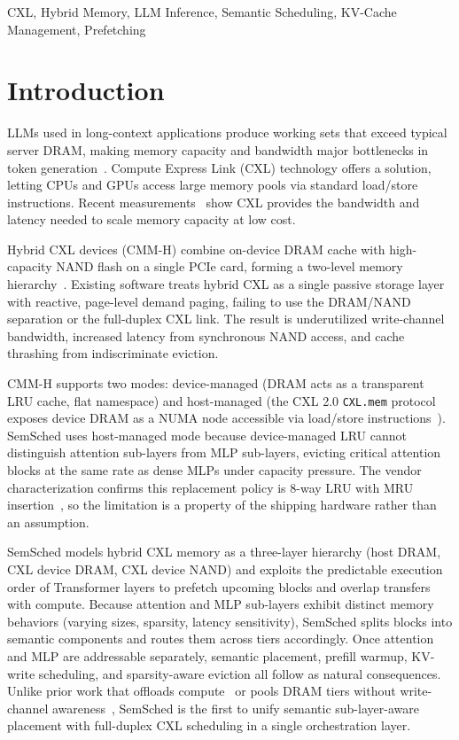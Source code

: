 \documentclass[10pt,conference,letterpaper]{IEEEtran}
\begin{document}
\begin{IEEEkeywords}
CXL, Hybrid Memory, LLM Inference, Semantic Scheduling, KV-Cache Management, Prefetching
\end{IEEEkeywords}

\section{Introduction}
\label{sec:intro}

\noindent
LLMs used in long-context applications produce working sets that exceed typical server DRAM, making memory capacity and bandwidth major bottlenecks in token generation~\cite{tang2024exploring}. Compute Express Link (CXL) technology offers a solution, letting CPUs and GPUs access large memory pools via standard load/store instructions. Recent measurements~\cite{gu2025pim,li2023pond,yang2025cxlaimpod} show CXL provides the bandwidth and latency needed to scale memory capacity at low cost.

Hybrid CXL devices (CMM-H) combine on-device DRAM cache with high-capacity NAND flash on a single PCIe card, forming a two-level memory hierarchy~\cite{soltaniyeh2025revisiting}. Existing software treats hybrid CXL as a single passive storage layer with reactive, page-level demand paging, failing to use the DRAM/NAND separation or the full-duplex CXL link. The result is underutilized write-channel bandwidth, increased latency from synchronous NAND access, and cache thrashing from indiscriminate eviction.

CMM-H supports two modes: device-managed (DRAM acts as a transparent LRU cache, flat namespace) and host-managed (the CXL 2.0 \texttt{CXL.mem} protocol exposes device DRAM as a NUMA node accessible via load/store instructions~\cite{soltaniyeh2025revisiting}). SemSched uses host-managed mode because device-managed LRU cannot distinguish attention sub-layers from MLP sub-layers, evicting critical attention blocks at the same rate as dense MLPs under capacity pressure. The vendor characterization confirms this replacement policy is 8-way LRU with MRU insertion~\cite{soltaniyeh2025revisiting,zeng2025performance}, so the limitation is a property of the shipping hardware rather than an assumption.

SemSched models hybrid CXL memory as a three-layer hierarchy (host DRAM, CXL device DRAM, CXL device NAND) and exploits the predictable execution order of Transformer layers to prefetch upcoming blocks and overlap transfers with compute. Because attention and MLP sub-layers exhibit distinct memory behaviors (varying sizes, sparsity, latency sensitivity), SemSched splits blocks into semantic components and routes them across tiers accordingly. Once attention and MLP are addressable separately, semantic placement, prefill warmup, KV-write scheduling, and sparsity-aware eviction all follow as natural consequences. Unlike prior work that offloads compute~\cite{kim2025lia} or pools DRAM tiers without write-channel awareness~\cite{alizadeh2024llm}, SemSched is the first to unify semantic sub-layer-aware placement with full-duplex CXL scheduling in a single orchestration layer.
\end{document}

